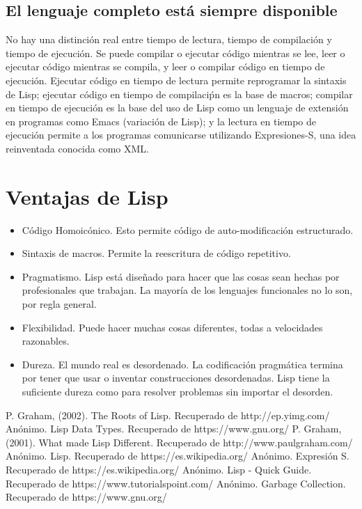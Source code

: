 \documentclass[10pt,journal,compsoc]{IEEEtran}
\begin{document}
\subsection{El lenguaje completo est\'a siempre disponible}
No hay una distinci\'on real entre tiempo de lectura, tiempo de compilaci\'on y tiempo de ejecuci\'on. Se puede compilar o ejecutar c\'odigo mientras se lee, leer o ejecutar c\'odigo mientras se compila,  y leer o compilar c\'odigo en tiempo de ejecuci\'on.
Ejecutar c\'odigo en tiempo de lectura permite reprogramar la sintaxis de Lisp; ejecutar c\'odigo en tiempo de compilaci\'pn es la base de macros; compilar en tiempo de ejecuci\'on es la base del uso de Lisp como un lenguaje de extensi\'on en programas como Emacs (variaci\'on de Lisp); y la lectura en tiempo de ejecuci\'on permite a los programas comunicarse utilizando Expresiones-S, una idea reinventada conocida como XML.

\section{Ventajas de Lisp}
\begin{itemize}
	\item C\'odigo Homoic\'onico. Esto permite c\'odigo de auto-modificaci\'on estructurado.
	\item Sintaxis de macros. Permite la reescritura de c\'odigo repetitivo.
	\item Pragmatismo. Lisp est\'a dise\~nado para hacer que las cosas sean hechas por profesionales que trabajan. La mayor\'ia de los lenguajes funcionales no lo son, por regla general.
	\item Flexibilidad. Puede hacer muchas cosas diferentes, todas a velocidades razonables.
	\item Dureza. El mundo real es desordenado. La codificaci\'on pragm\'atica termina por tener que usar o inventar construcciones desordenadas. Lisp tiene la suficiente dureza  como para resolver problemas sin importar el desorden.
\end{itemize}



\begin{thebibliography}{3}
	
	P. Graham, (2002). The Roots of Lisp. Recuperado de http://ep.yimg.com/
	An\'onimo. Lisp Data Types. Recuperado de https://www.gnu.org/
	P. Graham, (2001). What made Lisp Different. Recuperado de http://www.paulgraham.com/
	An\'onimo. Lisp. Recuperado de https://es.wikipedia.org/
	An\'onimo. Expresi\'on S. Recuperado de https://es.wikipedia.org/
	An\'onimo. Lisp - Quick Guide. Recuperado de https://www.tutorialspoint.com/
	An\'onimo. Garbage Collection. Recuperado de https://www.gnu.org/
	
\end{thebibliography}
\end{document}
